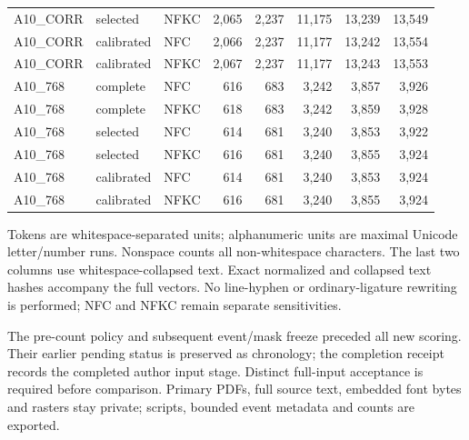 \documentclass[10pt]{article}
\begin{document}
\begin{center}
\begin{tabular}{lllrrrrr}
A10\_CORR & selected & NFKC & 2,065 & 2,237 & 11,175 & 13,239 & 13,549\\
A10\_CORR & calibrated & NFC & 2,066 & 2,237 & 11,177 & 13,242 & 13,554\\
A10\_CORR & calibrated & NFKC & 2,067 & 2,237 & 11,177 & 13,243 & 13,553\\
A10\_768 & complete & NFC & 616 & 683 & 3,242 & 3,857 & 3,926\\
A10\_768 & complete & NFKC & 618 & 683 & 3,242 & 3,859 & 3,928\\
A10\_768 & selected & NFC & 614 & 681 & 3,240 & 3,853 & 3,922\\
A10\_768 & selected & NFKC & 616 & 681 & 3,240 & 3,855 & 3,924\\
A10\_768 & calibrated & NFC & 614 & 681 & 3,240 & 3,853 & 3,924\\
A10\_768 & calibrated & NFKC & 616 & 681 & 3,240 & 3,855 & 3,924\\
\bottomrule\end{tabular}\end{center}
\small
Tokens are whitespace-separated units; alphanumeric units are maximal Unicode
letter/number runs. Nonspace counts all non-whitespace characters. The last two
columns use whitespace-collapsed text. Exact normalized and collapsed text hashes
accompany the full vectors. No line-hyphen or ordinary-ligature rewriting is
performed; NFC and NFKC remain separate sensitivities.

The pre-count policy and subsequent event/mask freeze preceded all new scoring.
Their earlier pending status is preserved as chronology; the completion receipt
records the completed author input stage. Distinct full-input acceptance is
required before comparison. Primary PDFs, full source text, embedded font bytes
and rasters stay private; scripts, bounded event metadata and counts are exported.
\end{document}
